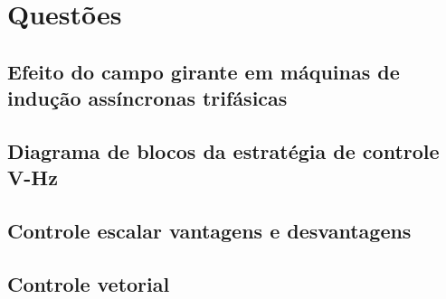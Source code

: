 \documentclass{article}
\begin{document}

\section{Questões}
\subsection{Efeito do campo girante em máquinas de indução assíncronas trifásicas}
\subsection{Diagrama de blocos da estratégia de controle V-Hz}
\subsection{Controle escalar vantagens e desvantagens}
\subsection{Controle vetorial}

\end{document}
